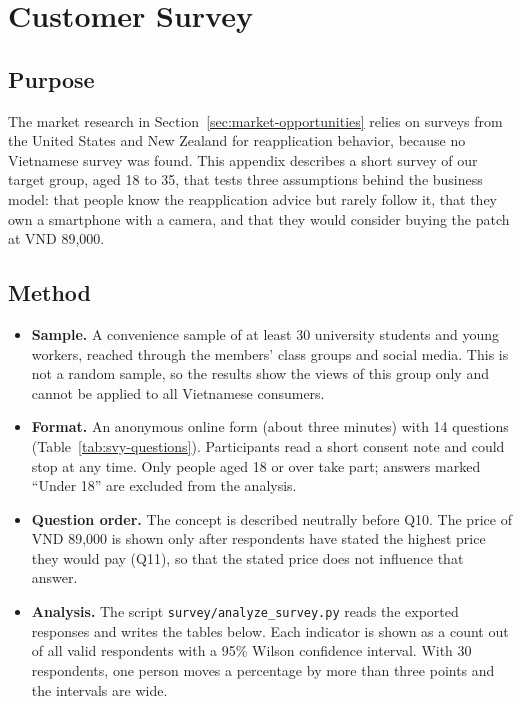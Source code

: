 \section{Customer Survey}\label{app:survey}

\subsection{Purpose}
The market research in Section~\ref{sec:market-opportunities} relies on surveys from the
United States and New Zealand for reapplication behavior, because no Vietnamese survey
was found. This appendix describes a short survey of our target group, aged 18 to 35,
that tests three assumptions behind the business model: that people know the
reapplication advice but rarely follow it, that they own a smartphone with a camera,
and that they would consider buying the patch at VND 89,000.

\subsection{Method}
\begin{itemize}[itemsep=0pt]
  \item \textbf{Sample.} A convenience sample of at least 30 university students and
    young workers, reached through the members' class groups and social media. This is
    not a random sample, so the results show the views of this group only and cannot be
    applied to all Vietnamese consumers.
  \item \textbf{Format.} An anonymous online form (about three minutes) with 14 questions
    (Table~\ref{tab:svy-questions}). Participants read a short consent note and could
    stop at any time. Only people aged 18 or over take part; answers marked ``Under 18''
    are excluded from the analysis.
  \item \textbf{Question order.} The concept is described neutrally before Q10. The price
    of VND 89,000 is shown only after respondents have stated the highest price they would
    pay (Q11), so that the stated price does not influence that answer.
  \item \textbf{Analysis.} The script \texttt{survey/analyze\_survey.py} reads the exported
    responses and writes the tables below. Each indicator is shown as a count out of all
    valid respondents with a 95\% Wilson confidence interval. With 30 respondents, one
    person moves a percentage by more than three points and the intervals are wide.
\end{itemize}


